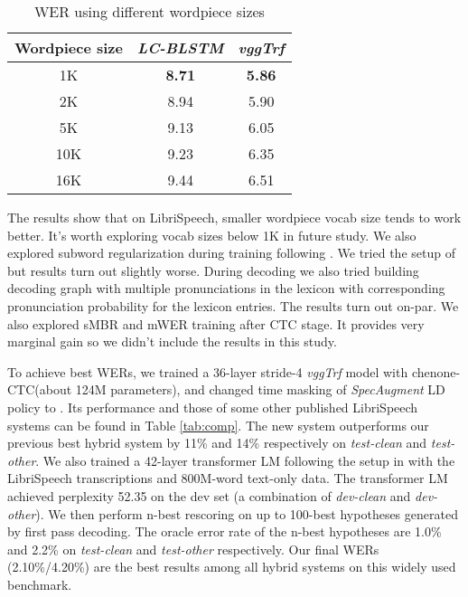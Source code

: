 \documentclass[a4paper]{article}
\begin{document}
\vspace{-0.5em}
\begin{table}[htb]
    \centering
    \caption{WER using different wordpiece sizes}
    \begin{tabular}{|c|cc|}
    \hline
    Wordpiece size & \emph{LC-BLSTM} & \emph{vggTrf} \\
    \hline\hline
    1K & \textbf{8.71} & \textbf{5.86} \\
    2K & 8.94 & 5.90 \\
    5K & 9.13 & 6.05 \\
    10K & 9.23 & 6.35 \\
    16K & 9.44 & 6.51 \\
    \hline
    \end{tabular}
    \label{tab:wp_sizes}
\end{table}
\vspace{-0.5em}

The results show that on LibriSpeech, smaller wordpiece vocab size tends to work better. It's worth exploring vocab sizes below 1K in future study. We also explored subword regularization during training following \cite{kudo2018subword}. We tried the setup of  but results turn out slightly worse. During decoding we also tried building decoding graph with multiple pronunciations in the lexicon with corresponding pronunciation probability for the lexicon entries. The results turn out on-par. We also explored sMBR and mWER training after CTC stage. It provides very marginal gain so we didn't include the results in this study. 

To achieve best WERs, we trained a 36-layer stride-4 \emph{vggTrf} model with chenone-CTC(about 124M parameters), and changed time masking of \emph{SpecAugment} LD policy to . Its performance and those of some other published LibriSpeech systems can be found in Table \ref{tab:comp}. The new system outperforms our previous best hybrid system\cite{wang2019transformerbased} by 11\% and 14\% respectively on \emph{test-clean} and \emph{test-other}. We also trained a 42-layer transformer LM following the setup in\cite{Irie_2019} with the LibriSpeech transcriptions and 800M-word text-only data. The transformer LM achieved perplexity 52.35 on the dev set (a combination of \emph{dev-clean} and \emph{dev-other}). We then perform n-best rescoring on up to 100-best hypotheses generated by first pass decoding. The oracle error rate of the n-best hypotheses are 1.0\% and 2.2\% on \emph{test-clean} and \emph{test-other} respectively. Our final WERs (2.10\%/4.20\%) are the best results among all hybrid systems on this widely used benchmark.
\end{document}
